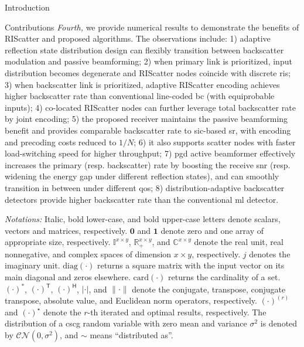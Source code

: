 \documentclass[journal]{IEEEtran}
\begin{document}
\begin{section}{Introduction}
\begin{subsection}{Contributions}
		\emph{Fourth,} we provide numerical results to demonstrate the benefits of RIScatter and proposed algorithms.
		The observations include:
		1) adaptive reflection state distribution design can flexibly transition between backscatter modulation and passive beamforming;
		2) when primary link is prioritized, input distribution becomes degenerate and RIScatter nodes coincide with discrete \gls{ris};
		3) when backscatter link is prioritized, adaptive RIScatter encoding achieves higher backscatter rate than conventional line-coded \gls{bc} (with equiprobable inputs);
		4) co-located RIScatter nodes can further leverage total backscatter rate by joint encoding;
		5) the proposed receiver maintains the passive beamforming benefit and provides comparable backscatter rate to \gls{sic}-based \gls{sr}, with encoding and precoding costs reduced to $1/N$;
		6) it also supports scatter nodes with faster load-switching speed for higher throughput;
		7) \gls{pgd} active beamformer effectively increases the primary (resp. backscatter) rate by boosting the receive \gls{snr} (resp. widening the energy gap under different reflection states), and can smoothly transition in between under different \gls{qos};
		8) distribution-adaptive backscatter detectors provide higher backscatter rate than the conventional \gls{ml} detector.
	\end{subsection}

	\emph{Notations:}
	Italic, bold lower-case, and bold upper-case letters denote scalars, vectors and matrices, respectively.
	$\boldsymbol{0}$ and $\boldsymbol{1}$ denote zero and one array of appropriate size, respectively. $\mathbb{I}^{x \times y}$, $\mathbb{R}_+^{x \times y}$, and $\mathbb{C}^{x \times y}$ denote the real unit, real nonnegative, and complex spaces of dimension $x \times y$, respectively.
	$j$ denotes the imaginary unit.
	$\mathrm{diag}(\cdot)$ returns a square matrix with the input vector on its main diagonal and zeros elsewhere.
	$\mathrm{card}(\cdot)$ returns the cardinality of a set.
	$(\cdot)^*$, $(\cdot)^\mathsf{T}$, $(\cdot)^\mathsf{H}$, $\lvert{\cdot}\rvert$, and $\lVert{\cdot}\rVert$ denote the conjugate, transpose, conjugate transpose, absolute value, and Euclidean norm operators, respectively.
	$(\cdot)^{(r)}$ and $(\cdot)^{\star}$ denote the $r$-th iterated and optimal results, respectively.
	The distribution of a \gls{cscg} random variable with zero mean and variance $\sigma^2$ is denoted by $\mathcal{CN}(0,\sigma^2)$, and $\sim$ means ``distributed as''.
\end{section}
\end{document}
